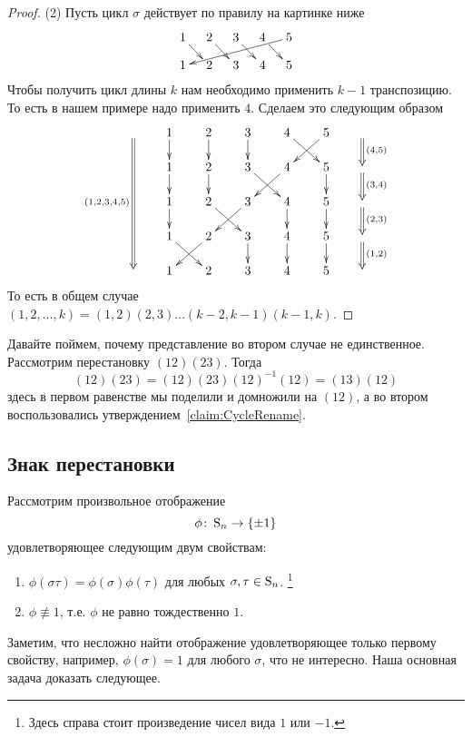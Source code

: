 \begin{proof}
(2) Пусть цикл $\sigma$ действует по правилу на картинке ниже
\[
\xymatrix@R=10pt@C=10pt{
  {1}\ar[dr]&{2}\ar[dr]&{3}\ar[dr]&{4}\ar[dr]&{5}\ar[dllll]\\
  {1}&{2}&{3}&{4}&{5}\\
}
\]
Чтобы получить цикл длины $k$ нам необходимо применить $k-1$ транспозицию. 
То есть в нашем примере надо применить $4$.
Сделаем это следующим образом
\[
\xymatrix@R=15pt@C=20pt{
  {}\ar@{=>}_{(1,2,3,4,5)}[dddd]&{1}\ar[d]&{2}\ar[d]&{3}\ar[d]&{4}\ar[dr]&{5}\ar[dl]&{}\ar@{=>}[d]^{(4,5)}\\
  {}&{1}\ar[d]&{2}\ar[d]&{3}\ar[dr]&{4}\ar[dl]&{5}\ar[d]&{}\ar@{=>}[d]^{(3,4)}\\
  {}&{1}\ar[d]&{2}\ar[dr]&{3}\ar[dl]&{4}\ar[d]&{5}\ar[d]&{}\ar@{=>}[d]^{(2,3)}\\
  {}&{1}\ar[dr]&{2}\ar[dl]&{3}\ar[d]&{4}\ar[d]&{5}\ar[d]&{}\ar@{=>}[d]^{(1,2)}\\
  {}&{1}&{2}&{3}&{4}&{5}&{}\\
}
\]
То есть в общем случае $(1,2,\ldots,k) = (1,2)(2,3)\ldots(k-2,k-1)(k-1,k)$.

\end{proof}

Давайте поймем, почему представление во втором случае не единственное.
Рассмотрим перестановку $(12)(23)$.
Тогда
\[
(12)(23) = (12)(23)(12)^{-1}(12) = (13)(12)
\]
здесь в первом равенстве мы поделили и домножили на $(12)$, а во втором воспользовались утверждением~\ref{claim:CycleRename}.

\subsection{Знак перестановки}

Рассмотрим произвольное отображение 
\[
\phi\colon \operatorname{S}_{n}\to \{\pm 1\}
\]
удовлетворяющее следующим двум свойствам:
\begin{enumerate}
\item $\phi(\sigma \tau) = \phi(\sigma)\phi(\tau)$ для любых $\sigma, \tau \in\operatorname{S}_{n}$.%
\footnote{Здесь справа стоит произведение чисел вида $1$ или $-1$.}

\item $\phi\not\equiv 1$, т.е. $\phi$ не равно тождественно $1$.
\end{enumerate}
Заметим, что несложно найти отображение удовлетворяющее только первому свойству, например, $\phi(\sigma) = 1$ для любого $\sigma$, что не интересно.
Наша основная задача доказать следующее.

